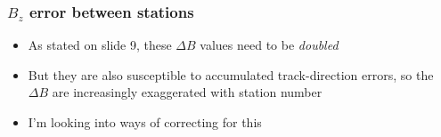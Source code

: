 \documentclass[compress]{beamer}
\begin{document}
\setcounter{page}{11}

\begin{frame}
\frametitle{$B_z$ error between stations }

\begin{itemize}
\item As stated on slide 9, these $\Delta B$ values need to be {\it doubled}
\item But they are also susceptible to accumulated track-direction
  errors, so the $\Delta B$ are increasingly exaggerated with station
  number
\item I'm looking into ways of correcting for this
\end{itemize}

\vfill
{}

\end{frame}

\end{document}
